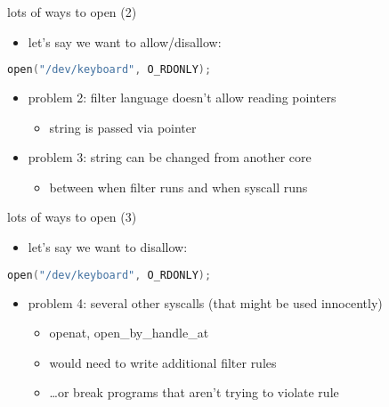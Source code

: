 \begin{frame}[fragile,label=openRuleP2]{lots of ways to open (2)}
\begin{itemize}
\item let's say we want to allow/disallow:
\end{itemize}
\begin{lstlisting}[language=C,style=smaller]
open("/dev/keyboard", O_RDONLY);
\end{lstlisting}
\begin{itemize}
\item problem 2: filter language doesn't allow reading pointers
    \begin{itemize}
    \item string is passed via pointer
    \end{itemize}
\item problem 3: string can be changed from another core
    \begin{itemize}
    \item between when filter runs and when syscall runs
    \end{itemize}
\end{itemize}
\end{frame}

\begin{frame}[fragile,label=openRuleP3]{lots of ways to open (3)}
\begin{itemize}
\item let's say we want to disallow:
\end{itemize}
\begin{lstlisting}[language=C,style=smaller]
open("/dev/keyboard", O_RDONLY);
\end{lstlisting}
\begin{itemize}
\item problem 4: several other syscalls (that might be used innocently)
    \begin{itemize}
    \item openat, open\_by\_handle\_at
    \item would need to write additional filter rules
    \item \ldots or break programs that aren't trying to violate rule
    \end{itemize}
\end{itemize}
\end{frame}

